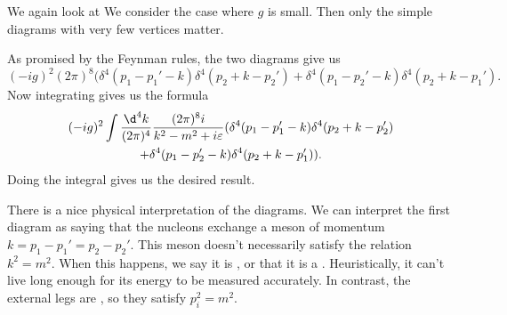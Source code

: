 \documentclass[a4paper]{article}
\begin{document}
\begin{eg}
  We again look at
  We consider the case where $g$ is small. Then only the simple diagrams with very few vertices matter.
  \begin{center}
    \quad
  \end{center}
  As promised by the Feynman rules, the two diagrams give us
  \[
    (-ig)^2 (2\pi)^8(\delta^4(p_1 - p_1' - k) \delta^4(p_2 + k - p_2') + \delta^4(p_1 - p_2' - k)\delta^4(p_2 + k - p_1').
  \]
  Now integrating gives us the formula
  \begin{multline*}
    (-ig)^2 \int \frac{\d^4 k}{(2\pi)^4} \frac{(2\pi)^8 i}{k^2 - m^2 + i \varepsilon} (\delta^4(p_1 - p_1' - k) \delta^4(p_2 + k - p_2') \\
    + \delta^4(p_1 - p_2' - k)\delta^4(p_2 + k - p_1')).
  \end{multline*}
  Doing the integral gives us the desired result.
\end{eg}
There is a nice physical interpretation of the diagrams. We can interpret the first diagram as saying that the nucleons exchange a meson of momentum $k = p_1 - p_1' = p_2 - p_2'$. This meson doesn't necessarily satisfy the relation $k^2 = m^2$. When this happens, we say it is , or that it is a . Heuristically, it can't live long enough for its energy to be measured accurately. In contrast, the external legs are , so they satisfy $p_i^2 = m^2$.
\end{document}
